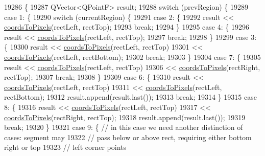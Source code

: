 \begin{DoxyCode}
19286                              \{
19287   QVector<QPointF> result;
19288   \textcolor{keywordflow}{switch} (prevRegion) \{
19289   \textcolor{keywordflow}{case} 1: \{
19290     \textcolor{keywordflow}{switch} (currentRegion) \{
19291     \textcolor{keywordflow}{case} 2: \{
19292       result << \hyperlink{class_q_c_p_abstract_plottable_ade710a776104b14c1c835168ce1bfc5c}{coordsToPixels}(rectLeft, rectTop);
19293       \textcolor{keywordflow}{break};
19294     \}
19295     \textcolor{keywordflow}{case} 4: \{
19296       result << \hyperlink{class_q_c_p_abstract_plottable_ade710a776104b14c1c835168ce1bfc5c}{coordsToPixels}(rectLeft, rectTop);
19297       \textcolor{keywordflow}{break};
19298     \}
19299     \textcolor{keywordflow}{case} 3: \{
19300       result << \hyperlink{class_q_c_p_abstract_plottable_ade710a776104b14c1c835168ce1bfc5c}{coordsToPixels}(rectLeft, rectTop)
19301              << \hyperlink{class_q_c_p_abstract_plottable_ade710a776104b14c1c835168ce1bfc5c}{coordsToPixels}(rectLeft, rectBottom);
19302       \textcolor{keywordflow}{break};
19303     \}
19304     \textcolor{keywordflow}{case} 7: \{
19305       result << \hyperlink{class_q_c_p_abstract_plottable_ade710a776104b14c1c835168ce1bfc5c}{coordsToPixels}(rectLeft, rectTop)
19306              << \hyperlink{class_q_c_p_abstract_plottable_ade710a776104b14c1c835168ce1bfc5c}{coordsToPixels}(rectRight, rectTop);
19307       \textcolor{keywordflow}{break};
19308     \}
19309     \textcolor{keywordflow}{case} 6: \{
19310       result << \hyperlink{class_q_c_p_abstract_plottable_ade710a776104b14c1c835168ce1bfc5c}{coordsToPixels}(rectLeft, rectTop)
19311              << \hyperlink{class_q_c_p_abstract_plottable_ade710a776104b14c1c835168ce1bfc5c}{coordsToPixels}(rectLeft, rectBottom);
19312       result.append(result.last());
19313       \textcolor{keywordflow}{break};
19314     \}
19315     \textcolor{keywordflow}{case} 8: \{
19316       result << \hyperlink{class_q_c_p_abstract_plottable_ade710a776104b14c1c835168ce1bfc5c}{coordsToPixels}(rectLeft, rectTop)
19317              << \hyperlink{class_q_c_p_abstract_plottable_ade710a776104b14c1c835168ce1bfc5c}{coordsToPixels}(rectRight, rectTop);
19318       result.append(result.last());
19319       \textcolor{keywordflow}{break};
19320     \}
19321     \textcolor{keywordflow}{case} 9: \{ \textcolor{comment}{// in this case we need another distinction of cases: segment may}
19322               \textcolor{comment}{// pass below or above rect, requiring either bottom right or top}
19323               \textcolor{comment}{// left corner points}

\end{DoxyCode}
